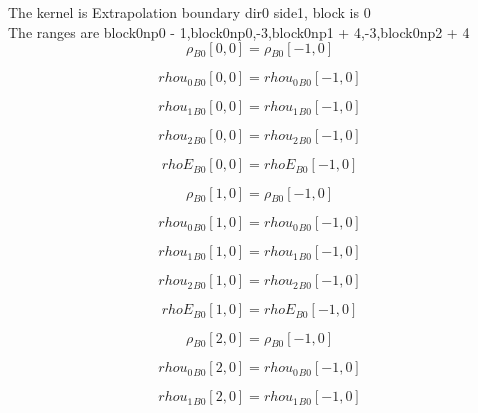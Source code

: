 \documentclass{article}
\begin{document}
\noindent The kernel is Extrapolation boundary dir0 side1, block is 0\\\noindent The ranges are block0np0 - 1,block0np0,-3,block0np1 + 4,-3,block0np2 + 4\\\begin{dmath}{\rho{_{B0}}}[{0,0}] = {\rho{_{B0}}}[{-1,0}]\end{dmath}

\begin{dmath}{rhou_{0}{_{B0}}}[{0,0}] = {rhou_{0}{_{B0}}}[{-1,0}]\end{dmath}

\begin{dmath}{rhou_{1}{_{B0}}}[{0,0}] = {rhou_{1}{_{B0}}}[{-1,0}]\end{dmath}

\begin{dmath}{rhou_{2}{_{B0}}}[{0,0}] = {rhou_{2}{_{B0}}}[{-1,0}]\end{dmath}

\begin{dmath}{rhoE{_{B0}}}[{0,0}] = {rhoE{_{B0}}}[{-1,0}]\end{dmath}

\begin{dmath}{\rho{_{B0}}}[{1,0}] = {\rho{_{B0}}}[{-1,0}]\end{dmath}

\begin{dmath}{rhou_{0}{_{B0}}}[{1,0}] = {rhou_{0}{_{B0}}}[{-1,0}]\end{dmath}

\begin{dmath}{rhou_{1}{_{B0}}}[{1,0}] = {rhou_{1}{_{B0}}}[{-1,0}]\end{dmath}

\begin{dmath}{rhou_{2}{_{B0}}}[{1,0}] = {rhou_{2}{_{B0}}}[{-1,0}]\end{dmath}

\begin{dmath}{rhoE{_{B0}}}[{1,0}] = {rhoE{_{B0}}}[{-1,0}]\end{dmath}

\begin{dmath}{\rho{_{B0}}}[{2,0}] = {\rho{_{B0}}}[{-1,0}]\end{dmath}

\begin{dmath}{rhou_{0}{_{B0}}}[{2,0}] = {rhou_{0}{_{B0}}}[{-1,0}]\end{dmath}

\begin{dmath}{rhou_{1}{_{B0}}}[{2,0}] = {rhou_{1}{_{B0}}}[{-1,0}]\end{dmath}
\end{document}
